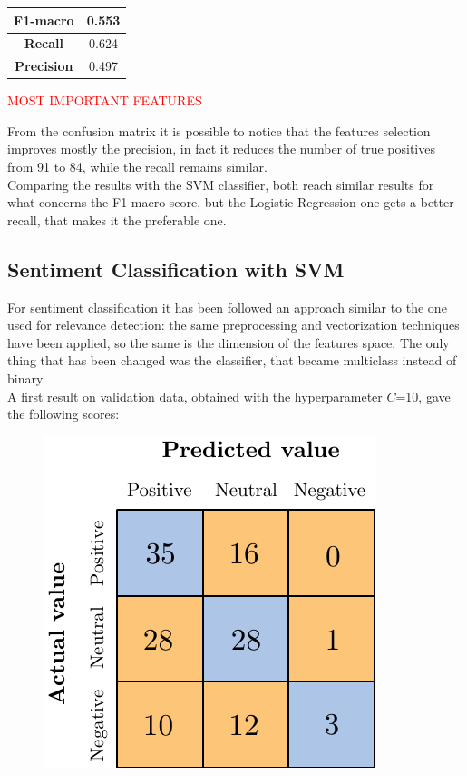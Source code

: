 \begin{center}
	\begin{tabular}{ | c | c | } 
		\hline
		\textbf{F1-macro} & 0.553 \\
		\hline
		\textbf{Recall} & 0.624 \\ 
		\hline
		\textbf{Precision} & 0.497 \\ 
		\hline
	\end{tabular}
\end{center}

\textcolor{red}{MOST IMPORTANT FEATURES}

From the confusion matrix it is possible to notice that the features selection improves mostly the precision, in fact it reduces the number of true positives from 91 to 84, while the recall remains similar.\\
Comparing the results with the SVM classifier, both reach similar results for what concerns the F1-macro score, but the Logistic Regression one gets a better recall, that makes it the preferable one.



\subsection{Sentiment Classification with SVM}

For sentiment classification it has been followed an approach similar to the one used for relevance detection: the same preprocessing and vectorization techniques have been applied, so the same is the dimension of the features space. The only thing that has been changed was the classifier, that became multiclass instead of binary. \\
A first result on validation data, obtained with the hyperparameter $C$=10, gave the following scores:

\begin{figure}[H]
	\centering
	\includegraphics[scale=1]{figures/conf_matrices/ita_snt_svm/ita_snt_svm_bfs.pdf}
	\label{fig:ita_snt_svm_bfs}
\end{figure}

